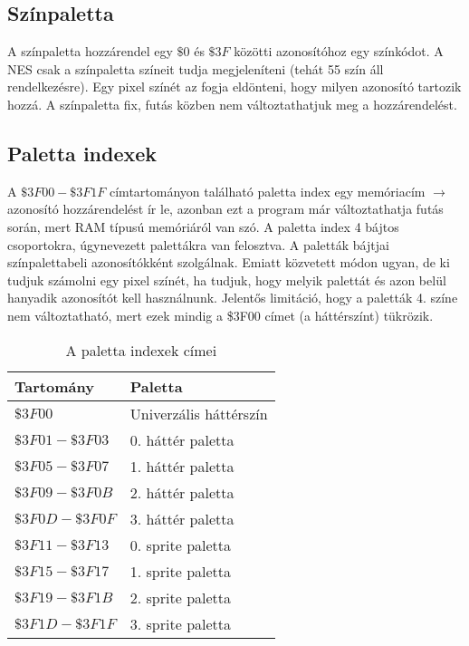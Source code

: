 \subsection{Színpaletta \cite{ppuref}}

A színpaletta hozzárendel egy $\$0$ és $\$3F$ közötti azonosítóhoz egy színkódot. A NES csak a színpaletta színeit tudja megjeleníteni (tehát 55 szín áll rendelkezésre). Egy pixel színét az fogja eldönteni, hogy milyen azonosító tartozik hozzá. A színpaletta fix, futás közben nem változtathatjuk meg a hozzárendelést.
\iffalse
\vspace{0.3cm}
\begin{figure}[H]
	\centering
	\texttt{[image: palette.png]}
	\caption{A 2C02 színpalettája}
\end{figure}
\clearpage
\fi

\subsection{Paletta indexek \cite{ppuref}}

A $\$3F00 - \$3F1F$ címtartományon található paletta index egy memóriacím $\rightarrow$ azonosító hozzárendelést ír le, azonban ezt a program már változtathatja futás során, mert RAM típusú memóriáról van szó. A paletta index 4 bájtos csoportokra, úgynevezett palettákra van felosztva. A paletták bájtjai színpalettabeli azonosítókként szolgálnak. Emiatt közvetett módon ugyan, de ki tudjuk számolni egy pixel színét, ha tudjuk, hogy melyik palettát és azon belül hanyadik azonosítót kell használnunk. Jelentős limitáció, hogy a paletták 4. színe nem változtatható, mert ezek mindig a \$3F00 címet (a háttérszínt) tükrözik.

\begin{table}[H]
	\centering
	\begin{tabular}{ | l | l | }
		\hline
		Tartomány & Paletta \\
		\hline			
		$ \$3F00 $ & Univerzális háttérszín \\
		$ \$3F01 - \$3F03 $ & 0. háttér paletta \\
		$ \$3F05 - \$3F07 $ & 1. háttér paletta \\
		$ \$3F09 - \$3F0B $ & 2. háttér paletta \\
		$ \$3F0D - \$3F0F $ & 3. háttér paletta \\
		$ \$3F11 - \$3F13 $ & 0. sprite paletta \\
		$ \$3F15 - \$3F17 $ & 1. sprite paletta \\
		$ \$3F19 - \$3F1B $ & 2. sprite paletta \\
		$ \$3F1D - \$3F1F $ & 3. sprite paletta \\
		\hline
	\end{tabular}
	\caption{A paletta indexek címei}
	\label{fig:paletteram}
\end{table}

